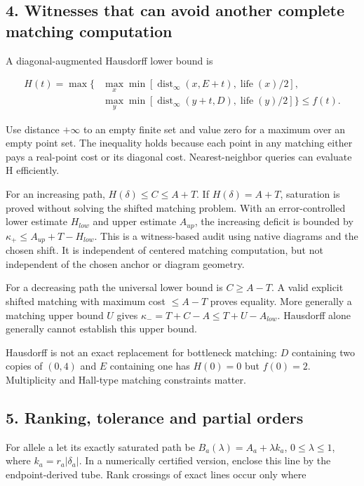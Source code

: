 \documentclass[
  11pt,
]{article}
\begin{document}
\subsection{4. Witnesses that can avoid another complete matching
computation}\label{witnesses-that-can-avoid-another-complete-matching-computation}

A diagonal-augmented Hausdorff lower bound is

\[
\begin{aligned}H(t)=\max\bigl\{&\max_x\min[\operatorname{dist}_{\infty}(x,E+t),\operatorname{life}(x)/2],\\ &\max_y\min[\operatorname{dist}_{\infty}(y+t,D),\operatorname{life}(y)/2]\bigr\}\leq f(t).\end{aligned}
\]

Use distance \(+\infty\) to an empty finite set and value zero for a
maximum over an empty point set. The inequality holds because each point
in any matching either pays a real-point cost or its diagonal cost.
Nearest-neighbor queries can evaluate H efficiently.

For an increasing path, \(H(\delta)\leq C\leq A+T\). If
\(H(\delta)=A+T\), saturation is proved without solving the shifted
matching problem. With an error-controlled lower estimate \(H_{low}\)
and upper estimate \(A_{up}\), the increasing deficit is bounded by
\(\kappa_+\leq A_{up}+T-H_{low}\). This is a witness-based audit using
native diagrams and the chosen shift. It is independent of centered
matching computation, but not independent of the chosen anchor or
diagram geometry.

For a decreasing path the universal lower bound is \(C\geq A-T\). A
valid explicit shifted matching with maximum cost \(\leq A-T\) proves
equality. More generally a matching upper bound \(U\) gives
\(\kappa_-=T+C-A\leq T+U-A_{low}\). Hausdorff alone generally cannot
establish this upper bound.

Hausdorff is not an exact replacement for bottleneck matching: \(D\)
containing two copies of \((0,4)\) and \(E\) containing one has
\(H(0)=0\) but \(f(0)=2\). Multiplicity and Hall-type matching
constraints matter.

\subsection{5. Ranking, tolerance and partial
orders}\label{ranking-tolerance-and-partial-orders}

For allele a let its exactly saturated path be
\(B_a(\lambda)=A_a+\lambda k_a\), \(0\leq \lambda\leq 1\), where
\(k_a=r_a|\delta_a|\). In a numerically certified version, enclose this
line by the endpoint-derived tube. Rank crossings of exact lines occur
only where
\end{document}
